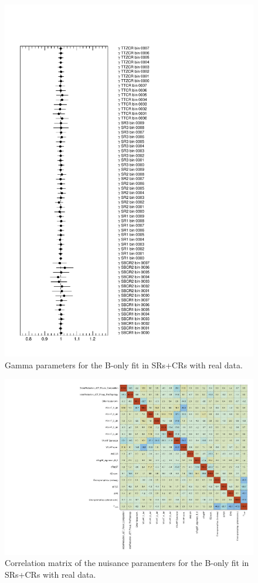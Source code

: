 \begin{figure}[htbp]
	\centering
	\includegraphics[width=.85\textwidth]{Chapters/CH8/figures/BONLY_CRSR_DL1rc_unblind/Gammas}
	\caption{Gamma parameters for the B-only \tZc fit in SRs+CRs with real data.}%
	\label{fig:stat:tzc:splusb:crsr:gamma_unb}
\end{figure}

\begin{figure}[htbp]
	\centering
	\includegraphics[width=.95\textwidth]{Chapters/CH8/figures/BONLY_CRSR_DL1rc_unblind/CorrMatrix}
	\caption{Correlation matrix of the nuisance paramenters for the B-only \tZc fit in SRs+CRs with real data.}%
	\label{fig:stat:tzc:splusb:crsr:corrmatrix_unb}
\end{figure}

